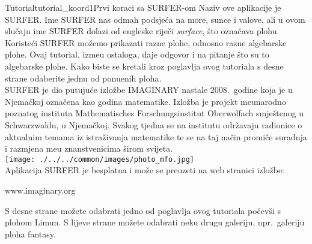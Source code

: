 \begin{surferIntroPage}{Tutorial}{tutorial_koord1}{Prvi koraci sa SURFER-om}
Naziv ove aplikacije je SURFER. Ime SURFER nas odmah podsje\' ca na more, sunce i valove, ali u ovom slu\v caju ime SURFER dolazi od engleske rije\v ci {\it surface}, \v sto ozna\v cava plohu.
\\
Koriste\' ci SURFER mo\v zemo prikazati razne plohe, odnosno razne algebarske plohe. Ovaj tutorial, izme\dj u ostaloga, daje odgovor i na pitanje \v sto su to algebarske plohe. Kako biste se kretali kroz poglavlja ovog tutoriala s desne strane odaberite jednu od ponu\dj enih ploha.\\
SURFER je dio putuju\' ce izlo\v zbe IMAGINARY nastale 2008.\ godine koja je u Njema\v ckoj ozna\v cena kao godina matematike. Izlo\v zba je projekt me\dj unarodno poznatog instituta Mathematisches Forschungsinstitut Oberwolfach smje\v stenog u Schwarzwaldu, u Njema\v ckoj. Svakog tjedna se na institutu odr\v zavaju radionice o aktualnim temama iz istra\v zivanja matematike te se na taj na\v cin promi\v ce suradnja i razmjena me\dj u znanstvenicima \v sirom svijeta. \\
\vspace{0.2cm} \hspace{3.5cm}\texttt{[image: ./../../common/images/photo\_mfo.jpg]}\\
Aplikacija SURFER je besplatna i mo\v ze se preuzeti na web stranici izlo\v zbe: 
\begin{center}
www.imaginary.org\\
\end{center}
 \vspace{0.2cm}
S desne strane mo\v zete odabrati jedno od poglavlja ovog tutoriala po\v cev\v si s plohom Limun. S lijeve strane mo\v zete odabrati neku drugu galeriju, npr.\ galeriju ploha fantasy.
\end{surferIntroPage}
